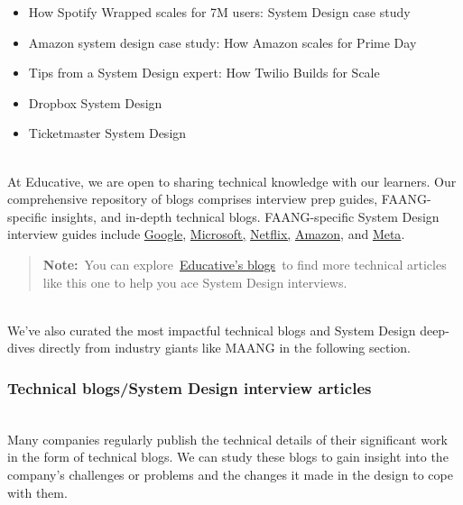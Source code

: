 \begin{itemize}
\item
\protect{}\label{z-sEm8p3Wcly5kWGs4yNc}
How Spotify Wrapped scales for 7M users: System Design case study
\item
\protect{}\label{fmAexmrynWuo6dHC_2mE3}
Amazon system design case study: How Amazon scales for Prime Day
\item
\protect{}\label{5tRHBngNTsfI9-L-pgYw9}
Tips from a System Design expert: How Twilio Builds for Scale
\item
\protect{}\label{B6EEaoFS3d9SOeE17ccb3}
Dropbox System Design
\item
\protect{}\label{5cpiOC3x3EYKiDuDnpFCc}
Ticketmaster System Design
\end{itemize}
\\
At Educative, we are open to sharing technical knowledge with our learners. Our comprehensive repository of blogs comprises interview prep guides, FAANG-specific insights, and in-depth technical blogs. FAANG-specific System Design interview guides include \href{https://www.educative.io/blog/google-system-design-interview-questions}{Google}, \href{https://www.educative.io/blog/microsoft-system-design-interview}{Microsoft,} \href{https://www.educative.io/blog/netflix-system-design-interview-questions}{Netflix,} \href{https://www.educative.io/blog/amazon-system-design-interview}{Amazon,} and \href{https://www.educative.io/blog/meta-system-design-interview}{Meta}.
\begin{quote}
\textbf{Note:}~You can explore~\href{https://www.educative.io/blog/category/system-design}{Educative's blogs}~to find more technical articles like this one to help you ace System Design interviews.
\end{quote}
\\
We've also curated the most impactful technical blogs and System Design deep-dives directly from industry giants like MAANG in the following section.

\subsubsection{Technical blogs/System Design interview articles}\label{xzOvihoye1j0wNF49ys-j}
\\
Many companies regularly publish the technical details of their significant work in the form of technical blogs. We can study these blogs to gain insight into the company's challenges or problems and the changes it made in the design to cope with them.

